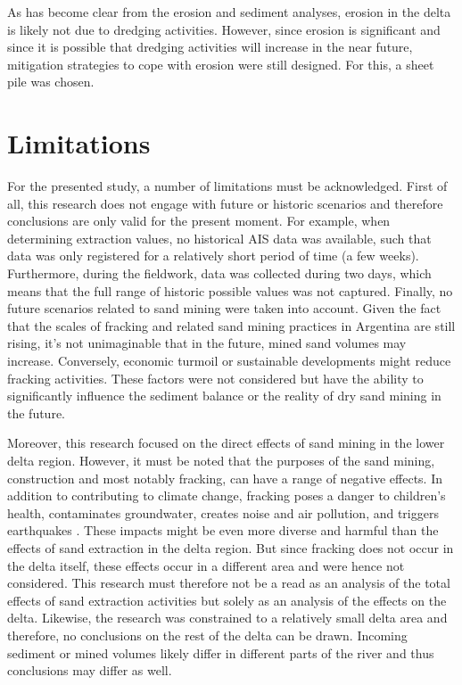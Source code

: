 As has become clear from the erosion and sediment analyses, erosion in the delta is likely not due to dredging activities. However, since erosion is significant and since it is possible that dredging activities will increase in the near future, mitigation strategies to cope with erosion were still designed. For this, a sheet pile was chosen.

\section{Limitations}
For the presented study, a number of limitations must be acknowledged. First of all, this research does not engage with future or historic scenarios and therefore conclusions are only valid for the present moment. For example, when determining extraction values, no historical AIS data was available, such that data was only registered for a relatively short period of time (a few weeks). Furthermore, during the fieldwork, data was collected during two days, which means that the full range of historic possible values was not captured. Finally, no future scenarios related to sand mining were taken into account. Given the fact that the scales of fracking and related sand mining practices in Argentina are still rising, it's not unimaginable that in the future, mined sand volumes may increase. Conversely, economic turmoil or sustainable developments might reduce fracking activities. These factors were not considered but have the ability to significantly influence the sediment balance or the reality of dry sand mining in the future.

Moreover, this research focused on the direct effects of sand mining in the lower delta region. However, it must be noted that the purposes of the sand mining, construction and most notably fracking, can have a range of negative effects. In addition to contributing to climate change, fracking poses a danger to children's health, contaminates groundwater, creates noise and air pollution, and triggers earthquakes \autocite{nussbaumYaleEnvironmentalHealth2024}. These impacts might be even more diverse and harmful than the effects of sand extraction in the delta region. But since fracking does not occur in the delta itself, these effects occur in a different area and were hence not considered. This research must therefore not be a read as an analysis of the total effects of sand extraction activities but solely as an analysis of the effects on the delta. Likewise, the research was constrained to a relatively small delta area and therefore, no conclusions on the rest of the delta can be drawn. Incoming sediment or mined volumes likely differ in different parts of the river and thus conclusions may differ as well.

